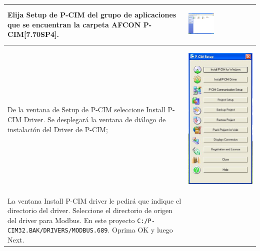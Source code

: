 \begin{table}[H]
\small
\centering
\renewcommand*{\arraystretch}{0.3}
\begin{tabular}{*{2}{m{}}}
\hline
  Elija Setup de P-CIM del grupo de aplicaciones que se encuentran la carpeta 
  AFCON P-CIM[7.70SP4]. 
  &\begin{center}
    \includegraphics[width=0.4\textwidth]
	{Cap5-SCADA/images/Dibujo1.JPG}
  \end{center}\\
\hline
  De la ventana de Setup de P-CIM seleccione Install P-CIM Driver.
  Se desplegará la ventana de diálogo de instalación del Driver de P-CIM;
  &\begin{center}
    \includegraphics[height=0.3\textwidth]
	{Cap5-SCADA/images/PcimSetup.jpeg}
  \end{center}\\
\hline
  La ventana Install P-CIM driver le pedirá que indique el directorio del
  driver. Seleccione el directorio de origen del driver para Modbus. En este
 proyecto \texttt{C:\slash P-CIM32.BAK\slash DRIVERS\slash MODBUS.689}.
 Oprima OK y luego Next.
  &\begin{center}
    \includegraphics[width=0.4\textwidth]

\end{center}
\end{tabular}
\end{table}

